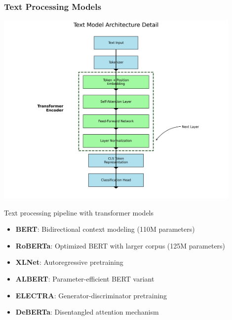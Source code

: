 \documentclass{beamer}
\begin{document}
\begin{frame}
\frametitle{Text Processing Models}
\begin{center}
\includegraphics[width=0.9\textwidth]{figures/text_model_architecture.png}
\caption{Text processing pipeline with transformer models}
\end{center}

\begin{itemize}
    \item \textbf{BERT}: Bidirectional context modeling (110M parameters)
    \item \textbf{RoBERTa}: Optimized BERT with larger corpus (125M parameters)
    \item \textbf{XLNet}: Autoregressive pretraining
    \item \textbf{ALBERT}: Parameter-efficient BERT variant
    \item \textbf{ELECTRA}: Generator-discriminator pretraining
    \item \textbf{DeBERTa}: Disentangled attention mechanism
\end{itemize}
\end{frame}
\end{document}
